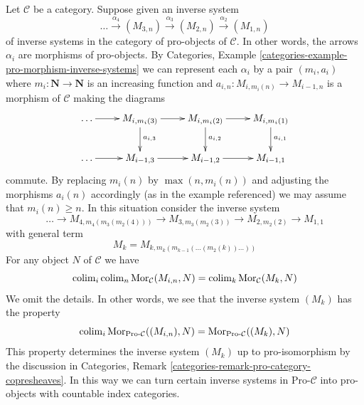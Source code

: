 \begin{remark}
\label{remark-compose-inverse-systems}
Let $\mathcal{C}$ be a category. Suppose given an inverse system
$$
\ldots \xrightarrow{\alpha_4} (M_{3, n}) \xrightarrow{\alpha_3} (M_{2, n})
\xrightarrow{\alpha_2} (M_{1, n})
$$
of inverse systems in the category of pro-objects of $\mathcal{C}$.
In other words, the arrows $\alpha_i$ are morphisms of pro-objects. By
Categories, Example \ref{categories-example-pro-morphism-inverse-systems}
we can represent each $\alpha_i$ by a pair $(m_i, a_i)$ where
$m_i : \mathbf{N} \to \mathbf{N}$ is an increasing function and
$a_{i, n} : M_{i, m_i(n)} \to M_{i - 1, n}$ is a morphism of $\mathcal{C}$
making the diagrams
$$
\xymatrix{
\ldots \ar[r] &
M_{i, m_i(3)} \ar[d]^{a_{i, 3}} \ar[r] &
M_{i, m_i(2)} \ar[d]^{a_{i, 2}} \ar[r] &
M_{i, m_i(1)} \ar[d]^{a_{i, 1}} \\
\ldots \ar[r] &
M_{i - 1, 3} \ar[r] &
M_{i - 1, 2} \ar[r] &
M_{i - 1, 1}
}
$$
commute. By replacing $m_i(n)$ by $\max(n, m_i(n))$ and adjusting
the morphisms $a_i(n)$ accordingly (as in the example referenced)
we may assume that $m_i(n) \geq n$. In this situation consider the
inverse system
$$
\ldots \to
M_{4, m_4(m_3(m_2(4)))} \to
M_{3, m_3(m_2(3))} \to
M_{2, m_2(2)} \to
M_{1, 1}
$$
with general term
$$
M_k = M_{k, m_k(m_{k - 1}(\ldots (m_2(k))\ldots))}
$$
For any object $N$ of $\mathcal{C}$ we have
$$
\mathop{\mathrm{colim}}\nolimits_i \mathop{\mathrm{colim}}\nolimits_n \mathop{\mathrm{Mor}}\nolimits_\mathcal{C}(M_{i, n}, N) =
\mathop{\mathrm{colim}}\nolimits_k \mathop{\mathrm{Mor}}\nolimits_\mathcal{C}(M_k, N) 
$$
We omit the details. In other words, we see that the inverse system $(M_k)$
has the property
$$
\mathop{\mathrm{colim}}\nolimits_i \mathop{\mathrm{Mor}}\nolimits_{\text{Pro-}\mathcal{C}}((M_{i, n}), N) =
\mathop{\mathrm{Mor}}\nolimits_{\text{Pro-}\mathcal{C}}((M_k), N)
$$
This property determines the inverse system $(M_k)$ up to pro-isomorphism
by the discussion in
Categories, Remark \ref{categories-remark-pro-category-copresheaves}.
In this way we can turn certain inverse systems in $\text{Pro-}\mathcal{C}$
into pro-objects with countable index categories.
\end{remark}

